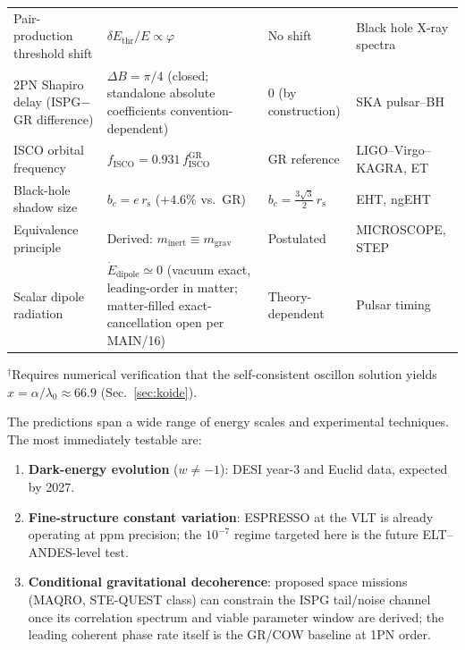 \documentclass[aps,prd,onecolumn,superscriptaddress,nofootinbib,showpacs,12pt,notitlepage]{revtex4-2}
\newcommand{\rs}{r_{\mathrm{s}}}
\begin{document}
\begin{table}[ht]
{\begin{tabular}{llll}
Pair-production threshold shift &
$\delta E_{\mathrm{thr}}/E \propto \varphi$ &
No shift &
Black hole X-ray spectra \\
\addlinespace
2PN Shapiro delay (ISPG$-$GR difference) &
$\Delta B = \pi/4$ (closed; standalone absolute coefficients convention-dependent) &
$0$ (by construction) &
SKA pulsar--BH \\
\addlinespace
ISCO orbital frequency &
$f_{\mathrm{ISCO}} = 0.931\,f_{\mathrm{ISCO}}^{\mathrm{GR}}$ &
GR reference &
LIGO--Virgo--KAGRA, ET \\
\addlinespace
Black-hole shadow size &
$b_c = e\,\rs$ ($+4.6\%$ vs.\ GR) &
$b_c = \tfrac{3\sqrt{3}}{2}\,\rs$ &
EHT, ngEHT \\
\addlinespace
Equivalence principle &
Derived: $m_{\mathrm{inert}} \equiv m_{\mathrm{grav}}$ &
Postulated &
MICROSCOPE, STEP \\
\addlinespace
Scalar dipole radiation &
$\dot{E}_{\mathrm{dipole}} \simeq 0$ (vacuum exact, leading-order in matter; matter-filled exact-cancellation open per MAIN/16) &
Theory-dependent &
Pulsar timing \\
\bottomrule
\end{tabular}}%

\smallskip
{\footnotesize ${}^{\dagger}$Requires numerical verification
  that the self-consistent oscillon solution yields
  $x = \alpha/\lambda_0 \approx 66.9$
  (Sec.~\ref{sec:koide}).}
\end{table}

The predictions span a wide range of energy scales
and experimental techniques.  The most immediately
testable are:
\begin{enumerate}
  \item \textbf{Dark-energy evolution} ($w \neq -1$):
    DESI year-3 and Euclid data, expected by 2027.
  \item \textbf{Fine-structure constant variation}:
    ESPRESSO at the VLT is already operating at ppm
    precision; the $10^{-7}$ regime targeted here is the
    future ELT--ANDES-level test.
  \item \textbf{Conditional gravitational decoherence}:
    proposed space missions (MAQRO, STE-QUEST class) can
    constrain the ISPG tail/noise channel once its
    correlation spectrum and viable parameter window are
    derived; the leading coherent phase rate itself is the
    GR/COW baseline at 1PN order.
\end{enumerate}

\end{document}
